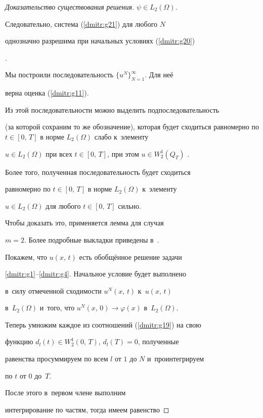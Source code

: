 \begin{proof}[Доказательство\,\,существования\,\,решения]
$\psi \in L_2(\Omega)$.


Следовательно, система (\ref{dmitr:g21}) для любого $N$


однозначно разрешима при начальных условиях (\ref{dmitr:g20})


\cite[с.~27]{dm:4}.





Мы построили последовательность $\{u^N\}_{N=1}^{\infty}$. Для неё


верна оценка (\ref{dmitr:g11}).


Из этой последовательности можно выделить подпоследовательность


(за которой сохраним то же обозначение), которая будет сходиться равномерно по $t\in[0,\, T]$ в норме $L_2(\Omega)$ слабо к~элементу


$u\in L_2(\Omega)$ при всех $t\in [0,\, T]$, при этом $u \in W_2^1(Q_T)$ \cite[с.~214]{dm:3}.





Более того, полученная последовательность будет сходиться


равномерно по $t\in[0,\,T]$ в норме $L_2(\Omega)$ к~элементу


$u \in L_2(\Omega)$ для любого $t\in [0,\,T]$ сильно.


Чтобы доказать это, применяется лемма \cite[с.~529]{dm:8} для случая


$m=2$. Более подробные выкладки приведены в~\cite{dm:b2}.





Покажем, что $u(x,\,t)$ есть обобщённое решение задачи


\eqref{dmitr:g1}--\eqref{dmitr:g4}. Начальное условие будет выполнено


 в~силу отмеченной сходимости $u^N(x,\,t)$ к~$u(x,\,t)$


в~$L_2(\Omega)$ и~того, что $u^N(x,\,0)\to\varphi(x)$ в~$L_2(\Omega)$.


Теперь умножим каждое из соотношений (\ref{dmitr:g19}) на свою


функцию $d_l(t) \in  W_2^1(0,\,T)$, $d_l(T) = 0$, полученные


равенства просуммируем по всем $l$ от $1$ до $N$ и~проинтегрируем


по $t$ от $0$ до~$T$.


После этого в~первом члене выполним


интегрирование по частям, тогда имеем равенство



\end{proof}
